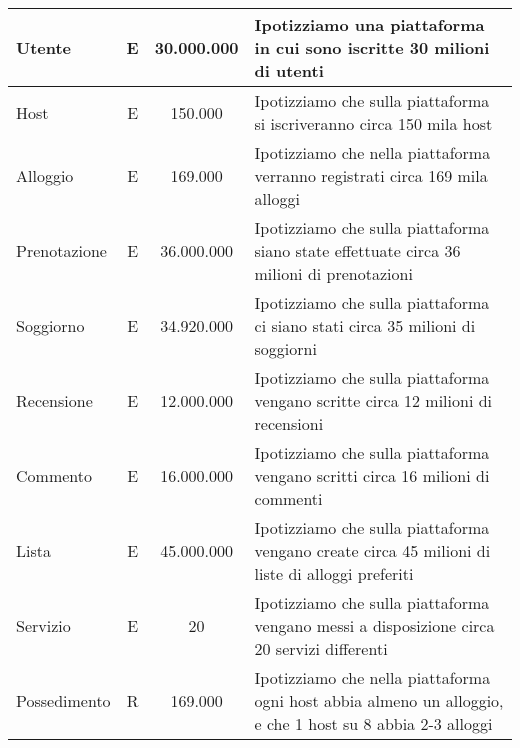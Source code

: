 \begin{longtable}{|l|c|c|p{6.2cm}|}
    \hline
    \endlastfoot
    Utente                   & E             & 30.000.000      & {Ipotizziamo una piattaforma in cui sono iscritte 30 milioni di utenti}                                                                     \\\hline
    Host                     & E             & 150.000         & {Ipotizziamo che sulla piattaforma si iscriveranno circa 150 mila host}                                                                       \\\hline
    Alloggio                 & E             & 169.000         & {Ipotizziamo che nella piattaforma verranno registrati circa 169 mila alloggi}                                                                    \\\hline
    Prenotazione             & E             & 36.000.000      & {Ipotizziamo che sulla piattaforma siano state effettuate circa 36 milioni di prenotazioni}                                                               \\\hline
    Soggiorno                & E             & 34.920.000      & {Ipotizziamo che sulla piattaforma ci siano stati circa 35 milioni di soggiorni}                                                                  \\\hline
    Recensione               & E             & 12.000.000      & {Ipotizziamo che sulla piattaforma vengano scritte circa 12 milioni di recensioni}                                                                 \\\hline
    Commento                 & E             & 16.000.000      & {Ipotizziamo che sulla piattaforma vengano scritti circa 16 milioni di commenti}                                                                   \\\hline
    Lista                    & E             & 45.000.000      & {Ipotizziamo che sulla piattaforma vengano create circa 45 milioni di liste di alloggi preferiti}                                                                  \\\hline
    Servizio                 & E             & 20              & {Ipotizziamo che sulla piattaforma vengano messi a disposizione circa 20 servizi differenti}                                                                 \\\hline
    Possedimento             & R             & 169.000         & {Ipotizziamo che nella piattaforma ogni host abbia almeno un alloggio, e che 1 host su 8 abbia 2-3 alloggi}                                                                    \\\hline

\end{longtable}
